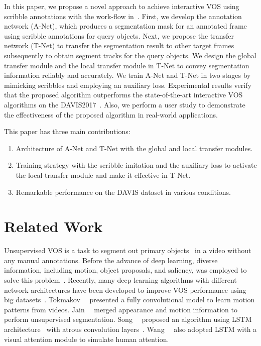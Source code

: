 \documentclass[runningheads]{llncs}
\begin{document}
In this paper, we propose a novel approach to achieve interactive VOS using scribble annotations with the work-flow in~\cite{DAVISchallenge2018}. First, we develop the annotation network (A-Net), which produces a segmentation mask for an annotated frame using scribble annotations for query objects. Next, we propose the transfer network (T-Net) to transfer the segmentation result to other target frames subsequently to obtain segment tracks for the query objects. We design the global transfer module and the local transfer module in T-Net to convey segmentation information reliably and accurately. We train A-Net and T-Net in two stages by mimicking scribbles and employing an auxiliary loss. Experimental results verify that the proposed algorithm outperforms the state-of-the-art interactive VOS algorithms on the DAVIS2017~\cite{DAVIS2017}. Also, we perform a user study to demonstrate the effectiveness of the proposed algorithm in real-world applications.

This paper has three main contributions:
\begin{enumerate}
    \item Architecture of A-Net and T-Net with the global and local transfer modules.
    \item Training strategy with the scribble imitation and the auxiliary loss to activate the local transfer module and make it effective in T-Net.
    \item Remarkable performance on the DAVIS dataset in various conditions.
\end{enumerate}

\section{Related Work}

Unsupervised VOS is a task to segment out primary objects~\cite{Koh2016pod} in a video without any manual annotations. Before the advance of deep learning, diverse information, including motion, object proposals, and saliency, was employed to solve this problem~\cite{wang2015saliency, papazoglou2013fast, jang2016primary, Koh2017primary, Koh2018}. Recently, many deep learning algorithms with different network architectures have been developed to improve VOS performance using big datasets~\cite{DAVIS2017,Youtube2018}. Tokmakov~\etal~\cite{tokmakov2017learning} presented a fully convolutional model to learn motion patterns from videos. Jain~\etal~\cite{jain2017fusionseg} merged appearance and motion information to perform unsupervised segmentation. Song~\etal~\cite{song2018pyramid} proposed an algorithm using LSTM architecture~\cite{gers1999learning} with atrous convolution layers~\cite{chen2014semantic}. Wang~\etal~\cite{wang2019learning} also adopted LSTM with a visual attention module to simulate human attention.
\end{document}
